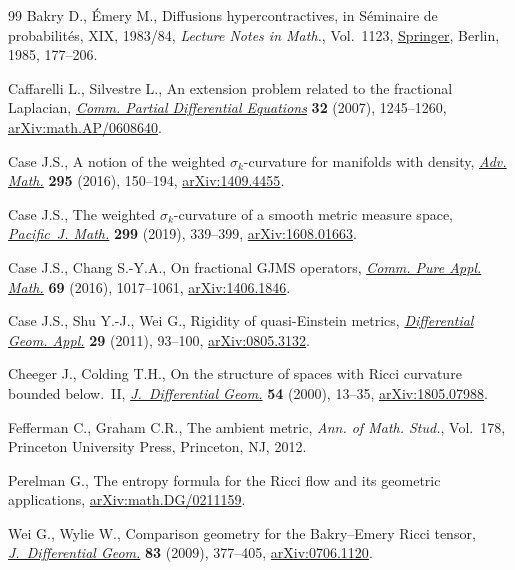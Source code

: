 \documentclass[11pt]{article}
\numberwithin{equation}{section}
\numberwithin{equation}{section}
\begin{document}
\begin{thebibliography}{99}
Bakry D., \'Emery M., Diffusions hypercontractives, in S\'eminaire de
 probabilit\'es, {XIX}, 1983/84, \textit{Lecture Notes in Math.}, Vol.~1123,
 \href{https://doi.org/10.1007/BFb0075847}{Springer}, Berlin, 1985, 177--206.

Caffarelli L., Silvestre L., An extension problem related to the fractional
 {L}aplacian, \href{https://doi.org/10.1080/03605300600987306}{\textit{Comm. Partial Differential Equations}} \textbf{32}
 (2007), 1245--1260, \href{https://arxiv.org/abs/math.AP/0608640}{arXiv:math.AP/0608640}.

Case J.S., A notion of the weighted {$\sigma_k$}-curvature for manifolds with
 density, \href{https://doi.org/10.1016/j.aim.2016.03.010}{\textit{Adv. Math.}} \textbf{295} (2016), 150--194,
 \href{https://arxiv.org/abs/1409.4455}{arXiv:1409.4455}.

Case J.S., The weighted {$\sigma_k$}-curvature of a smooth metric measure
 space, \href{https://doi.org/10.2140/pjm.2019.299.339}{\textit{Pacific~J. Math.}} \textbf{299} (2019), 339--399,
 \href{https://arxiv.org/abs/1608.01663}{arXiv:1608.01663}.

Case J.S., Chang S.-Y.A., On fractional {GJMS} operators, \href{https://doi.org/10.1002/cpa.21564}{\textit{Comm. Pure
 Appl. Math.}} \textbf{69} (2016), 1017--1061, \href{https://arxiv.org/abs/1406.1846}{arXiv:1406.1846}.

Case J.S., Shu Y.-J., Wei G., Rigidity of quasi-{E}instein metrics,
 \href{https://doi.org/10.1016/j.difgeo.2010.11.003}{\textit{Differential Geom. Appl.}} \textbf{29} (2011), 93--100,
 \href{https://arxiv.org/abs/0805.3132}{arXiv:0805.3132}.

Cheeger J., Colding T.H., On the structure of spaces with {R}icci curvature
 bounded below.~{II}, \href{https://doi.org/10.4310/jdg/1214342145}{\textit{J.~Differential Geom.}} \textbf{54} (2000),
 13--35, \href{https://arxiv.org/abs/1805.07988}{arXiv:1805.07988}.

Fefferman C., Graham C.R., The ambient metric, \textit{Ann. of Math. Stud.},
 Vol.~178, Princeton University Press, Princeton, NJ, 2012.

Perelman G., The entropy formula for the {R}icci flow and its geometric
 applications, \href{https://arxiv.org/abs/math.DG/0211159}{arXiv:math.DG/0211159}.

Wei G., Wylie W., Comparison geometry for the {B}akry--{E}mery {R}icci tensor,
 \href{https://doi.org/10.4310/jdg/1261495336}{\textit{J.~Differential Geom.}} \textbf{83} (2009), 377--405,
 \href{https://arxiv.org/abs/0706.1120}{arXiv:0706.1120}.

\end{thebibliography}
\end{document}

